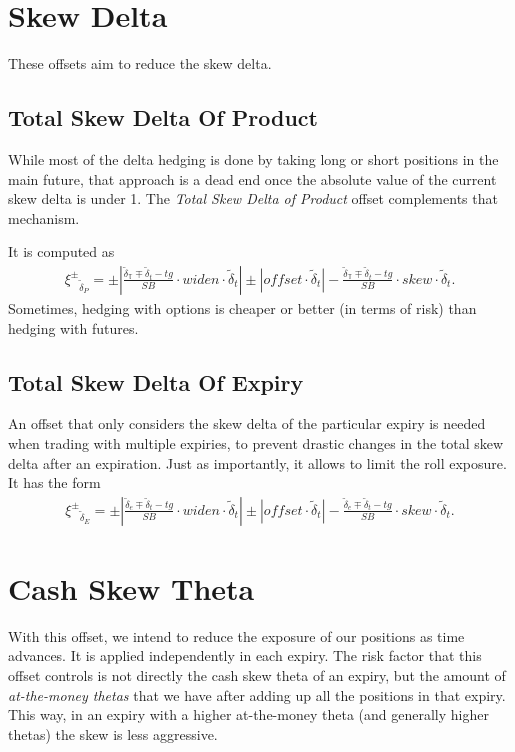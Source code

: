 \documentclass[10pt, a4paper, oneside]{article}
\newcommand{\total}{\ensuremath{\mathbb{T}}}
\newcommand{\sdelta}{\ensuremath{\tilde{\delta}}}
\newcommand{\offsetbs}{\ensuremath{\xi^{\pm}}}
\newcommand{\target}{\ensuremath{\mathit{tg}}}
\newcommand{\widen}{\ensuremath{\mathit{widen}}}
\newcommand{\skw}{\ensuremath{\mathit{skew}}}
\newcommand{\offset}{\ensuremath{\mathit{offset}}}
\newcommand{\skewunits}[3]{\ensuremath{\frac{{#1}\mp{#2}-\target}{{#3}}}}
\newcommand{\offsetformula}[4]{{\begin{align*}\offsetbs_{#4}=\pm\left|\skewunits{#1}{#2}{#3}\cdot\widen\cdot{#2}\right| \pm \left|\offset\cdot{#2}\right| - \skewunits{#1}{#2}{#3}\cdot\skw\cdot{#2}.\end{align*}}}
\begin{document}
\section{Skew Delta}

\noindent These offsets aim to reduce the skew delta.

\subsection{Total Skew Delta Of Product}

\noindent While most of the delta hedging is done by taking long or short positions in the main future, that approach is a dead end once the absolute value of the current skew delta is under 1. The \emph{Total Skew Delta of Product} offset complements that mechanism.

\noindent It is computed as
\offsetformula{\sdelta_\total}{\sdelta_t}{SB}{\sdelta_P}
\noindent Sometimes, hedging with options is cheaper or better (in terms of risk) than hedging with futures.

\subsection{Total Skew Delta Of Expiry}

\noindent An offset that only considers the skew delta of the particular expiry is needed when trading with multiple expiries, to prevent drastic changes in the total skew delta after an expiration. Just as importantly, it allows to limit the roll exposure. It has the form
\offsetformula{\sdelta_e}{\sdelta_t}{SB}{\sdelta_E}









\section{Cash Skew Theta}

\noindent With this offset, we intend to reduce the exposure of our positions as time advances. It is applied independently in each expiry. The risk factor that this offset controls is not directly the cash skew theta of an expiry, but the amount of \emph{at-the-money thetas}
that we have after adding up all the positions in that expiry. This way, in an expiry with a higher at-the-money theta (and generally higher thetas) the skew is less aggressive.
\end{document}
